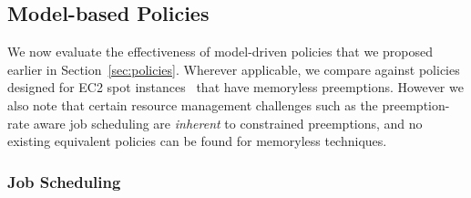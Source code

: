 \vspace*{\subsecspace}
\subsection{Model-based Policies}
\label{subsec:eval-policy}

We now evaluate the effectiveness of model-driven policies that we proposed earlier in Section~\ref{sec:policies}.
%
Wherever applicable, we compare against policies designed for EC2 spot instances~\cite{harlap2018tributary, spoton} that have memoryless preemptions. 
%
However we also note that certain resource management challenges such as the preemption-rate aware job scheduling are \emph{inherent} to constrained preemptions, and no existing equivalent policies can be found for memoryless techniques. 




\vspace*{\subsecspace}
\subsubsection{Job Scheduling}



